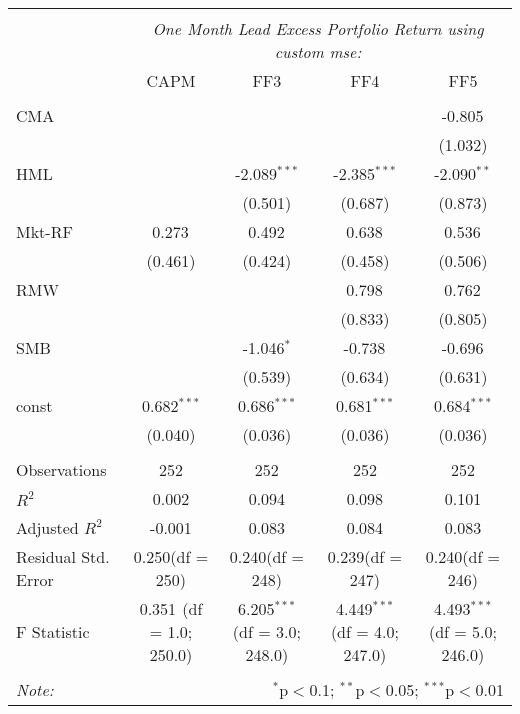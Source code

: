 \begin{table}[!htbp] \centering
\begin{tabular}{@{\extracolsep{5pt}}lcccc}
\\[-1.8ex]\hline
\hline \\[-1.8ex]
& \multicolumn{4}{c}{\textit{One Month Lead Excess Portfolio Return using custom mse:}} \
\cr \cline{4-5}
\\[-1.8ex] & CAPM & FF3 & FF4 & FF5 \\
\hline \\[-1.8ex]
 CMA & & & & -0.805$^{}$ \\
  & & & & (1.032) \\
 HML & & -2.089$^{***}$ & -2.385$^{***}$ & -2.090$^{**}$ \\
  & & (0.501) & (0.687) & (0.873) \\
 Mkt-RF & 0.273$^{}$ & 0.492$^{}$ & 0.638$^{}$ & 0.536$^{}$ \\
  & (0.461) & (0.424) & (0.458) & (0.506) \\
 RMW & & & 0.798$^{}$ & 0.762$^{}$ \\
  & & & (0.833) & (0.805) \\
 SMB & & -1.046$^{*}$ & -0.738$^{}$ & -0.696$^{}$ \\
  & & (0.539) & (0.634) & (0.631) \\
 const & 0.682$^{***}$ & 0.686$^{***}$ & 0.681$^{***}$ & 0.684$^{***}$ \\
  & (0.040) & (0.036) & (0.036) & (0.036) \\
\hline \\[-1.8ex]
 Observations & 252 & 252 & 252 & 252 \\
 $R^2$ & 0.002 & 0.094 & 0.098 & 0.101 \\
 Adjusted $R^2$ & -0.001 & 0.083 & 0.084 & 0.083 \\
 Residual Std. Error & 0.250(df = 250) & 0.240(df = 248) & 0.239(df = 247) & 0.240(df = 246)  \\
 F Statistic & 0.351$^{}$ (df = 1.0; 250.0) & 6.205$^{***}$ (df = 3.0; 248.0) & 4.449$^{***}$ (df = 4.0; 247.0) & 4.493$^{***}$ (df = 5.0; 246.0) \\
\hline
\hline \\[-1.8ex]
\textit{Note:} & \multicolumn{4}{r}{$^{*}$p$<$0.1; $^{**}$p$<$0.05; $^{***}$p$<$0.01} \\
\end{tabular}
\end{table}
